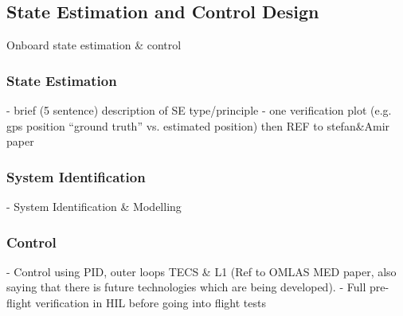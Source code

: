 \subsection{State Estimation and Control Design}
Onboard state estimation \& control
\subsubsection{State Estimation}
\label{secsec:StateEstimation}
  - brief (5 sentence) description of SE type/principle
  - one verification plot (e.g. gps position ``ground truth'' vs. estimated position) 
  then REF to stefan\&Amir paper

\subsubsection{System Identification}
 - System Identification \& Modelling
 
 \subsubsection{Control}
 - Control using PID,  outer loops TECS \& L1 (Ref to OMLAS MED paper, also saying that there is future technologies which are being developed).
 - Full pre-flight verification in HIL before going into flight tests
 
